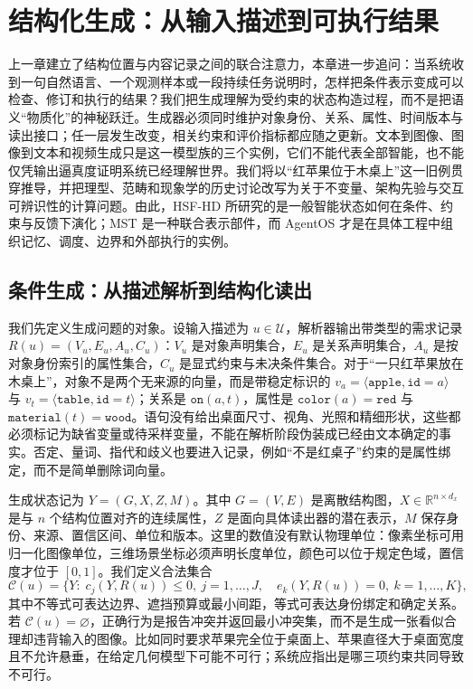 \chapter{结构化生成：从输入描述到可执行结果}
\label{chp:generative_creation}

上一章建立了结构位置与内容记录之间的联合注意力，本章进一步追问：当系统收到一句自然语言、一个观测样本或一段持续任务说明时，怎样把条件表示变成可以检查、修订和执行的结果？我们把生成理解为受约束的状态构造过程，而不是把语义“物质化”的神秘跃迁。生成器必须同时维护对象身份、关系、属性、时间版本与读出接口；任一层发生改变，相关约束和评价指标都应随之更新。文本到图像、图像到文本和视频生成只是这一模型族的三个实例，它们不能代表全部智能，也不能仅凭输出逼真度证明系统已经理解世界。我们将以“红苹果位于木桌上”这一旧例贯穿推导，并把理型、范畴和现象学的历史讨论改写为关于不变量、架构先验与交互可辨识性的计算问题。由此，HSF-HD 所研究的是一般智能状态如何在条件、约束与反馈下演化；MST 是一种联合表示部件，而 AgentOS 才是在具体工程中组织记忆、调度、边界和外部执行的实例。

\section{条件生成：从描述解析到结构化读出}
\label{sec:text_image_msc}

我们先定义生成问题的对象。设输入描述为 $u\in\mathcal U$，解析器输出带类型的需求记录 $R(u)=(V_u,E_u,A_u,C_u)$：$V_u$ 是对象声明集合，$E_u$ 是关系声明集合，$A_u$ 是按对象身份索引的属性集合，$C_u$ 是显式约束与未决条件集合。对于“一只红苹果放在木桌上”，对象不是两个无来源的向量，而是带稳定标识的 $v_a=\langle\texttt{apple},\texttt{id}=a\rangle$ 与 $v_t=\langle\texttt{table},\texttt{id}=t\rangle$；关系是 $\texttt{on}(a,t)$，属性是 $\texttt{color}(a)=\texttt{red}$ 与 $\texttt{material}(t)=\texttt{wood}$。语句没有给出桌面尺寸、视角、光照和精细形状，这些都必须标记为缺省变量或待采样变量，不能在解析阶段伪装成已经由文本确定的事实。否定、量词、指代和歧义也要进入记录，例如“不是红桌子”约束的是属性绑定，而不是简单删除词向量。

生成状态记为 $Y=(G,X,Z,M)$。其中 $G=(V,E)$ 是离散结构图，$X\in\mathbb R^{n\times d_x}$ 是与 $n$ 个结构位置对齐的连续属性，$Z$ 是面向具体读出器的潜在表示，$M$ 保存身份、来源、置信区间、单位和版本。这里的数值没有默认物理单位：像素坐标可用归一化图像单位，三维场景坐标必须声明长度单位，颜色可以位于规定色域，置信度才位于 $[0,1]$。我们定义合法集合
\begin{equation}
  \mathcal C(u)=\{Y:\;c_j(Y,R(u))\le 0,\ j=1,\ldots,J,\quad e_k(Y,R(u))=0,\ k=1,\ldots,K\},
\end{equation}
其中不等式可表达边界、遮挡预算或最小间距，等式可表达身份绑定和确定关系。若 $\mathcal C(u)=\varnothing$，正确行为是报告冲突并返回最小冲突集，而不是生成一张看似合理却违背输入的图像。比如同时要求苹果完全位于桌面上、苹果直径大于桌面宽度且不允许悬垂，在给定几何模型下可能不可行；系统应指出是哪三项约束共同导致不可行。

